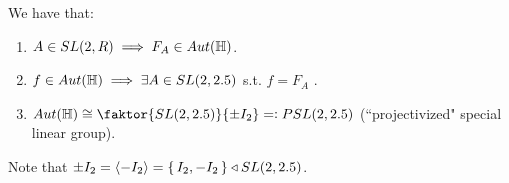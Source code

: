 
\begin{theorem}
We have that:
\begin{enumerate}
    \item $A \in SL(2,R) \implies F_A \in Aut(\mathbb{H})$.
    \item $f \in Aut(\mathbb{H}) \implies \exists A \in SL(2, 2.5)$ s.t. $f = F_A$
    .
    \item $Aut( \HH ) \cong  \faktor{SL(2, \R)}{ \pm I_2} = \vcentcolon PSL(2,\R)$ (``projectivized" special linear group).
\end{enumerate}


\end{theorem}

\begin{note}
Note that $\pm I_2 = \langle -I_2 \rangle = \set{ I_2, -I_2 } \triangleleft SL(2, 2.5)$.
\end{note}


